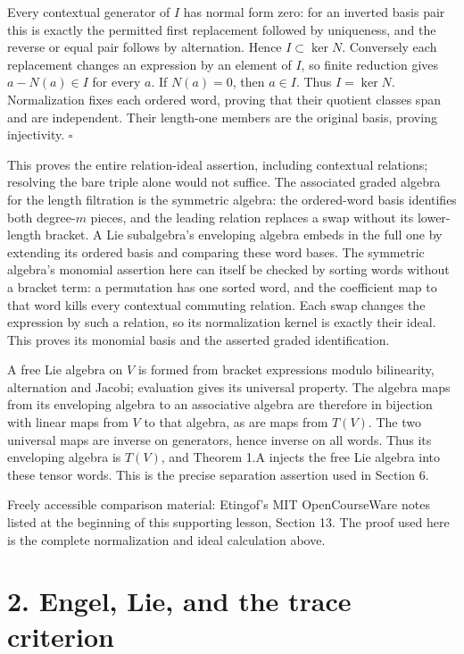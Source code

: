 \documentclass[11pt,a4paper,openany]{report}
\begin{document}
Every contextual generator of \(I\) has normal form zero: for an inverted basis pair this is exactly the permitted first replacement followed by uniqueness, and the reverse or equal pair follows by alternation. Hence \(I\subset\ker N\). Conversely each replacement changes an expression by an element of \(I\), so finite reduction gives \(a-N(a)\in I\) for every \(a\). If \(N(a)=0\), then \(a\in I\). Thus \(I=\ker N\). Normalization fixes each ordered word, proving that their quotient classes span and are independent. Their length-one members are the original basis, proving injectivity. \(\square\)

This proves the entire relation-ideal assertion, including contextual relations; resolving the bare triple alone would not suffice. The associated graded algebra for the length filtration is the symmetric algebra: the ordered-word basis identifies both degree-\(m\) pieces, and the leading relation replaces a swap without its lower-length bracket. A Lie subalgebra's enveloping algebra embeds in the full one by extending its ordered basis and comparing these word bases. The symmetric algebra's monomial assertion here can itself be checked by sorting words without a bracket term: a permutation has one sorted word, and the coefficient map to that word kills every contextual commuting relation. Each swap changes the expression by such a relation, so its normalization kernel is exactly their ideal. This proves its monomial basis and the asserted graded identification.

A free Lie algebra on \(V\) is formed from bracket expressions modulo bilinearity, alternation and Jacobi; evaluation gives its universal property. The algebra maps from its enveloping algebra to an associative algebra are therefore in bijection with linear maps from \(V\) to that algebra, as are maps from \(T(V)\). The two universal maps are inverse on generators, hence inverse on all words. Thus its enveloping algebra is \(T(V)\), and Theorem 1.A injects the free Lie algebra into these tensor words. This is the precise separation assertion used in Section 6.

Freely accessible comparison material: Etingof's MIT OpenCourseWare notes listed at the beginning of this supporting lesson, Section 13. The proof used here is the complete normalization and ideal calculation above.

\section{2. Engel, Lie, and the trace criterion}\label{AG-RG-S06-engel-lie-and-the-trace-criterion}
\end{document}
